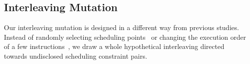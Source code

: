 

\subsection{Interleaving Mutation}
\label{ss:scheduler}

\newcommand{\segment}{segment graph\xspace}
\newcommand{\segments}{segment graphs\xspace}
\newcommand{\Segments}{Segment graphs\xspace}

%







Our interleaving mutation is designed in a different way from previous
studies.
%
Instead of randomly selecting scheduling points~\cite{krace, ski} or
changing the execution order of a few instructions~\cite{razzer,
  snowboard}, we draw a whole hypothetical interleaving directed
towards undisclosed scheduling constraint pairs.

